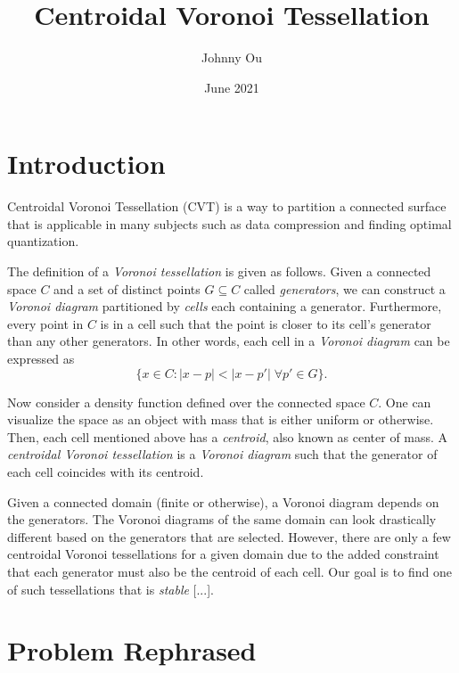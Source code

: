 \documentclass{article}
\title{Centroidal Voronoi Tessellation}
\author{Johnny Ou}
\date{June 2021}
\begin{document}
\maketitle

\section{Introduction}

Centroidal Voronoi Tessellation (CVT) is a way to partition a connected surface that is applicable in many subjects such as data compression and finding optimal quantization.

The definition of a \textit{Voronoi tessellation} is given as follows. Given a connected space $C$ and a set of distinct points $G \subseteq C$ called \textit{generators}, we can construct a \textit{Voronoi diagram} partitioned by \textit{cells} each containing a generator. Furthermore, every point in $C$ is in a cell such that the point is closer to its cell's generator than any other generators. In other words, each cell in a \textit{Voronoi diagram} can be expressed as
$$\{ x \in C : |x - p| < |x - p'| \; \forall p' \in G \}.$$


Now consider a density function defined over the connected space $C$. One can visualize the space as an object with mass that is either uniform or otherwise. Then, each cell mentioned above has a \textit{centroid}, also known as center of mass. A \textit{centroidal Voronoi tessellation} is a \textit{Voronoi diagram} such that the generator of each cell coincides with its centroid.

Given a connected domain (finite or otherwise), a Voronoi diagram depends on the generators. The Voronoi diagrams of the same domain can look drastically different based on the generators that are selected. However, there are only a few centroidal Voronoi tessellations for a given domain due to the added constraint that each generator must also be the centroid of each cell. Our goal is to find one of such tessellations that is \textit{stable} [...].

\section{Problem Rephrased}
\end{document}
